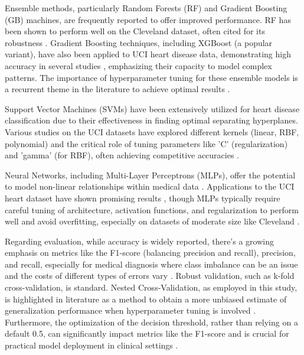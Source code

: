 \documentclass{article}
\begin{document}
Ensemble methods, particularly Random Forests (RF) and Gradient Boosting (GB) machines, are frequently reported to offer improved performance. RF has been shown to perform well on the Cleveland dataset, often cited for its robustness \cite{Pandi2023, Pratama2023}. Gradient Boosting techniques, including XGBoost (a popular variant), have also been applied to UCI heart disease data, demonstrating high accuracy in several studies \cite{Javeed2022, deCatheuGithub}, emphasizing their capacity to model complex patterns. The importance of hyperparameter tuning for these ensemble models is a recurrent theme in the literature to achieve optimal results \cite{Kadhim2023, Subasi2024}.

Support Vector Machines (SVMs) have been extensively utilized for heart disease classification due to their effectiveness in finding optimal separating hyperplanes. Various studies on the UCI datasets have explored different kernels (linear, RBF, polynomial) and the critical role of tuning parameters like 'C' (regularization) and 'gamma' (for RBF), often achieving competitive accuracies \cite{Dubey2021}.

Neural Networks, including Multi-Layer Perceptrons (MLPs), offer the potential to model non-linear relationships within medical data \cite{ElHasnony2022}. Applications to the UCI heart dataset have shown promising results \cite{BhattacharyyaGithub, KaggleRyanDsouzaMLP}, though MLPs typically require careful tuning of architecture, activation functions, and regularization to perform well and avoid overfitting, especially on datasets of moderate size like Cleveland \cite{Alomar2024}.

Regarding evaluation, while accuracy is widely reported, there's a growing emphasis on metrics like the F1-score (balancing precision and recall), precision, and recall, especially for medical diagnosis where class imbalance can be an issue and the costs of different types of errors vary \cite{EncordF1, LyzrF1, NumberF1}. Robust validation, such as k-fold cross-validation, is standard. Nested Cross-Validation, as employed in this study, is highlighted in literature as a method to obtain a more unbiased estimate of generalization performance when hyperparameter tuning is involved \cite{WickerNestedCV, StackExchangeNestedCV}. Furthermore, the optimization of the decision threshold, rather than relying on a default 0.5, can significantly impact metrics like the F1-score and is crucial for practical model deployment in clinical settings \cite{FuturenseF1}.
\end{document}
